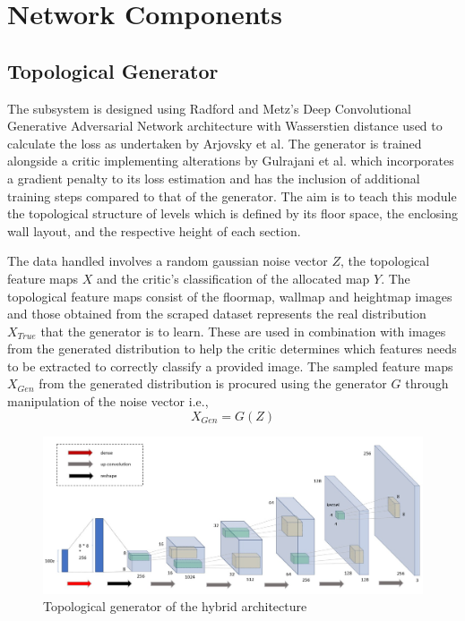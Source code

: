 \documentclass{Configuration_Files/PoliMi3i_thesis}
\begin{document}
\section{Network Components}
\subsection{Topological Generator}
The subsystem is designed using Radford and Metz’s Deep Convolutional 
Generative Adversarial Network architecture with Wasserstien distance used to 
calculate the loss as undertaken by Arjovsky et al. The generator is trained alongside 
a critic implementing alterations by Gulrajani et al. which incorporates a gradient 
penalty to its loss estimation and has the inclusion of additional training steps 
compared to that of the generator. The aim is to teach this module the topological 
structure of levels which is defined by its floor space, the enclosing wall layout, and 
the respective height of each section.

The data handled involves a random gaussian noise vector $Z$, the topological feature 
maps $X$ and the critic’s classification of the allocated map $Y$. The topological 
feature maps consist of the floormap, wallmap and heightmap images and those obtained from 
the scraped dataset represents the real distribution $X_{True}$ that the generator is to learn. 
These are used in combination with images from the generated distribution to help the critic 
determines which features needs to be extracted to correctly classify a provided image. 
The sampled feature maps $X_{Gen}$ from the generated distribution is 
procured using the generator $G$ through manipulation of the noise vector i.e.,
\begin{equation} \label{eq:wgen}
X_{Gen} = G(Z)
\end{equation}
\begin{figure}[H]
    \centering
    \includegraphics[width=1\textwidth]{wgan.jpg}
    \caption{Topological generator of the hybrid architecture}
    \label{fig:wgan}
\end{figure}
\newpage
\end{document}
